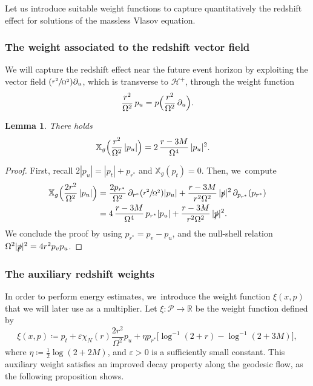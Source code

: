 \documentclass[10pt]{amsart}
\newcommand{\Psfrac}[2]{(\sfrac{#1}{#2})}
\let\epsilon\varepsilon
\theoremstyle{plain}
\newtheorem{lemma}[proposition]{Lemma}
\theoremstyle{definition}
\newcommand\R{{\mathbb{R}}}
\newcommand\T{{\mathbb{X}}}
\renewcommand\H{{\mathcal{H}^+}}
\begin{document}
Let us introduce suitable weight functions to capture quantitatively the redshift effect for solutions of the massless Vlasov equation.

\subsubsection{The weight associated to the redshift vector field}
We will capture the redshift effect near the future event horizon by exploiting the vector field $\Psfrac{r^2}{\Omega^2}\partial_u$, which is transverse to $\H$, through the weight function
\[
\frac{r^2}{\Omega^2}\,p_u=p\Bigl(\frac{r^2}{\Omega^2}\,\partial_u\Bigr).
\]

\begin{lemma}\label{LemRS}
There holds
\begin{align*}
\T_g \Bigl(\frac{r^2}{\Omega^2}\, |p_u| \Bigr) & = 2\,\frac{r-3M}{\Omega^4}\,|p_u|^2.
\end{align*}
\end{lemma}
\begin{proof}
First, recall $2|p_u|=|p_t|+p_{r^*}$ and $\T_g(p_t)=0$. Then, we~compute
\begin{align*}
\T_g \Bigl(\frac{2r^2}{\Omega^2}\, |p_u| \Bigr) & = \frac{2p_{r^*}}{\Omega^2}\, \partial_{r^*}(\sfrac{r^2}{\Omega^2}) |p_u| +\frac{r-3M}{r^2 \Omega^2}\, |\slashed{p}|^2\, \partial_{p_{r^*}} (p_{r^*}) \\
& = 4\,\frac{r-3M}{\Omega^4}\,p_{r^*}|p_u| + \frac{r-3M}{r^2\Omega^2}\, |\slashed{p}|^2.
\end{align*}
We conclude the proof by using $p_{r^*}=p_v-p_u$, and the null-shell relation $\Omega^2 |\slashed{p}|^2=4r^2p_vp_u$.
\end{proof}

\subsubsection{The auxiliary redshift weights}

In order to perform energy estimates, we~introduce the weight function $\xi(x,p)$ that we will later use as a multiplier. Let $\xi \colon \mathcal{P}\to \R$ be the weight function defined by
\[
\xi(x,p)\coloneqq p_t+ \epsilon \chi_N (r) \frac{2r^2}{\Omega^2} p_u +\eta p_{r^*} \bigl[ \log^{-1}(2+r) -\log^{-1}(2+3M) \bigr],
\]
where $\eta \coloneqq \frac{1}{2}\log(2+2M)$, and $\epsilon >0$ is a sufficiently small constant. This auxiliary weight satisfies an improved decay property along the geodesic flow, as the following proposition shows.
\end{document}
